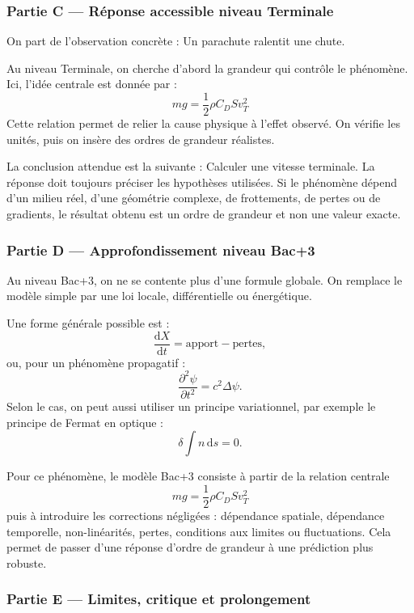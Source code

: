 \documentclass[11pt,a4paper]{article}
\begin{document}
\subsubsection*{Partie C — Réponse accessible niveau Terminale}

\begin{corrigebox}
On part de l'observation concrète : Un parachute ralentit une chute.

Au niveau Terminale, on cherche d'abord la grandeur qui contrôle le phénomène. Ici, l'idée centrale est donnée par :
\[
mg=\frac12\rho C_DSv_T^2
\]
Cette relation permet de relier la cause physique à l'effet observé. On vérifie les unités, puis on insère des ordres de grandeur réalistes.

La conclusion attendue est la suivante : Calculer une vitesse terminale. La réponse doit toujours préciser les hypothèses utilisées. Si le phénomène dépend d'un milieu réel, d'une géométrie complexe, de frottements, de pertes ou de gradients, le résultat obtenu est un ordre de grandeur et non une valeur exacte.
\end{corrigebox}

\subsubsection*{Partie D — Approfondissement niveau Bac+3}

\begin{approfondissementbox}
Au niveau Bac+3, on ne se contente plus d'une formule globale. On remplace le modèle simple par une loi locale, différentielle ou énergétique.

Une forme générale possible est :
\[
\frac{\mathrm d X}{\mathrm dt}=\text{apport}-\text{pertes},
\]
ou, pour un phénomène propagatif :
\[
\frac{\partial^2 \psi}{\partial t^2}=c^2\Delta\psi.
\]
Selon le cas, on peut aussi utiliser un principe variationnel, par exemple le principe de Fermat en optique :
\[
\delta \int n\,\mathrm ds=0.
\]

Pour ce phénomène, le modèle Bac+3 consiste à partir de la relation centrale
\[
mg=\frac12\rho C_DSv_T^2
\]
puis à introduire les corrections négligées : dépendance spatiale, dépendance temporelle, non-linéarités, pertes, conditions aux limites ou fluctuations. Cela permet de passer d'une réponse d'ordre de grandeur à une prédiction plus robuste.
\end{approfondissementbox}

\subsubsection*{Partie E — Limites, critique et prolongement}
\end{document}
